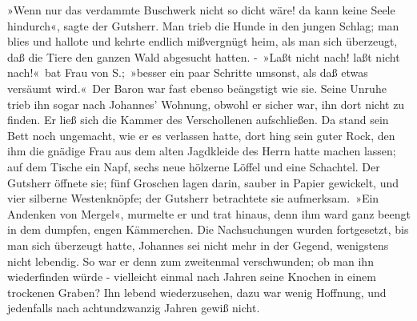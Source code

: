 »Wenn nur das verdammte Buschwerk nicht so dicht wäre! da kann keine Seele hindurch«, sagte der Gutsherr. Man trieb die Hunde in den jungen Schlag; man blies und hallote und kehrte endlich mißvergnügt heim, als man sich überzeugt, daß die Tiere den ganzen Wald abgesucht hatten. - »Laßt nicht nach! laßt nicht nach!« bat Frau von S.; »besser ein paar Schritte umsonst, als daß etwas versäumt wird.« Der Baron war fast ebenso beängstigt wie sie. Seine Unruhe trieb ihn sogar nach Johannes’ Wohnung, obwohl er sicher war, ihn dort nicht zu finden. Er ließ sich die Kammer des Verschollenen aufschließen. Da stand sein Bett noch ungemacht, wie er es verlassen hatte, dort hing sein guter Rock, den ihm die gnädige Frau aus dem alten Jagdkleide des Herrn hatte machen lassen; auf dem Tische ein Napf, sechs neue hölzerne Löffel und eine Schachtel. Der Gutsherr öffnete sie; fünf Groschen lagen darin, sauber in Papier gewickelt, und vier silberne Westenknöpfe; der Gutsherr betrachtete sie aufmerksam. »Ein Andenken von Mergel«, murmelte er und trat hinaus, denn ihm ward ganz beengt in dem dumpfen, engen Kämmerchen. Die Nachsuchungen wurden fortgesetzt, bis man sich überzeugt hatte, Johannes sei nicht mehr in der Gegend, wenigstens nicht lebendig. So war er denn zum zweitenmal verschwunden; ob man ihn wiederfinden würde - vielleicht einmal nach Jahren seine Knochen in einem trockenen Graben? Ihn lebend wiederzusehen, dazu war wenig Hoffnung, und jedenfalls nach achtundzwanzig Jahren gewiß nicht.


